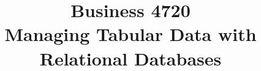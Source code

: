 \documentclass{article}
\title{Business 4720\\ \vspace{\baselineskip}
Managing Tabular Data with Relational Databases}
\begin{document}
\maketitle

\vfill

\clearpage


\end{document}

